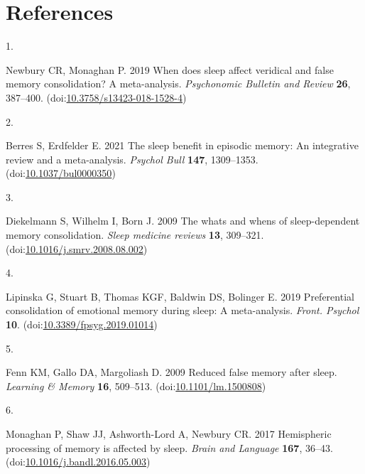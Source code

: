 \documentclass[
]{article}
\newlength{\cslhangindent}
\newlength{\csllabelwidth}
\newlength{\cslentryspacingunit} %
\newenvironment{CSLReferences}[2] %
 {%
  \setlength{\parindent}{0pt}
  \ifodd #1
  \let\oldpar\par
  \def\par{\hangindent=\cslhangindent\oldpar}
  \fi
  \setlength{\parskip}{#2\cslentryspacingunit}
 }%
 {}
\newcommand{\CSLLeftMargin}[1]{\parbox[t]{\csllabelwidth}{#1}}
\newcommand{\CSLRightInline}[1]{\parbox[t]{\linewidth - \csllabelwidth}{#1}\break}
\begin{document}
\hypertarget{references}{%
\section*{References}\label{references}}

\hypertarget{refs}{}
\begin{CSLReferences}{0}{0}
\leavevmode{}%
\CSLLeftMargin{1. }%
\CSLRightInline{Newbury CR, Monaghan P. 2019 When does sleep affect veridical and false memory consolidation? A meta-analysis. \emph{Psychonomic Bulletin and Review} \textbf{26}, 387--400. (doi:\href{https://doi.org/10.3758/s13423-018-1528-4}{10.3758/s13423-018-1528-4})}

\leavevmode{}%
\CSLLeftMargin{2. }%
\CSLRightInline{Berres S, Erdfelder E. 2021 The sleep benefit in episodic memory: An integrative review and a meta-analysis. \emph{Psychol Bull} \textbf{147}, 1309--1353. (doi:\href{https://doi.org/10.1037/bul0000350}{10.1037/bul0000350})}

\leavevmode{}%
\CSLLeftMargin{3. }%
\CSLRightInline{Diekelmann S, Wilhelm I, Born J. 2009 The whats and whens of sleep-dependent memory consolidation. \emph{Sleep medicine reviews} \textbf{13}, 309--321. (doi:\href{https://doi.org/10.1016/j.smrv.2008.08.002}{10.1016/j.smrv.2008.08.002})}

\leavevmode{}%
\CSLLeftMargin{4. }%
\CSLRightInline{Lipinska G, Stuart B, Thomas KGF, Baldwin DS, Bolinger E. 2019 Preferential consolidation of emotional memory during sleep: A meta-analysis. \emph{Front. Psychol} \textbf{10}. (doi:\href{https://doi.org/10.3389/fpsyg.2019.01014}{10.3389/fpsyg.2019.01014})}

\leavevmode{}%
\CSLLeftMargin{5. }%
\CSLRightInline{Fenn KM, Gallo DA, Margoliash D. 2009 Reduced false memory after sleep. \emph{Learning \& Memory} \textbf{16}, 509--513. (doi:\href{https://doi.org/10.1101/lm.1500808}{10.1101/lm.1500808})}

\leavevmode{}%
\CSLLeftMargin{6. }%
\CSLRightInline{Monaghan P, Shaw JJ, Ashworth-Lord A, Newbury CR. 2017 Hemispheric processing of memory is affected by sleep. \emph{Brain and Language} \textbf{167}, 36--43. (doi:\href{https://doi.org/10.1016/j.bandl.2016.05.003}{10.1016/j.bandl.2016.05.003})}


\end{CSLReferences}
\end{document}

